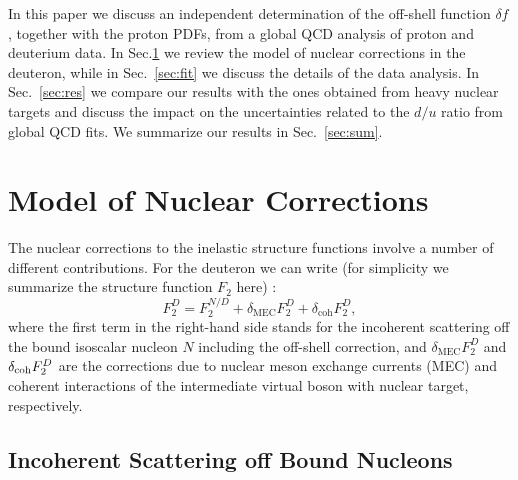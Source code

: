 \documentclass[%
      aps,
      prd,
      floatfix,
      preprintnumbers,
      preprint,
      showpacs,
      nofootinbib,
      tightenlines,
      amssymb,
      amsmath
]{revtex4-1}
\begin{document}
In this paper we discuss an independent determination of the off-shell function $\delta f$,  
together with the proton PDFs, from a global QCD analysis of proton and deuterium data.  
In Sec.\ref{sec:model} we review the model of nuclear corrections in the deuteron, while 
in Sec.~\ref{sec:fit} we discuss the details of the data analysis. In Sec.~\ref{sec:res} we compare our 
results with the ones obtained from heavy nuclear targets and discuss the impact on the uncertainties 
related to the $d/u$ ratio from global QCD fits. We summarize our results in Sec.~\ref{sec:sum}. 


\section{Model of Nuclear Corrections}
\label{sec:model}

The nuclear corrections to the inelastic structure functions involve a number of different contributions. 
For the deuteron we can write 
(for simplicity we summarize the structure function $F_2$ here) \cite{KP04,KP14}:
%
\begin{equation}
\label{F2D}
F_2^D = F_2^{N/D} + \delta_\mathrm{MEC} F_2^D + \delta_\mathrm{coh} F_2^D,
\end{equation}
%
where the first term in the right-hand side stands for the incoherent scattering off the 
bound isoscalar nucleon $N$ including the off-shell correction,
and $\delta_\mathrm{MEC} F_2^D$ and $\delta_{\rm coh} F_2^D$ are the corrections
due to nuclear meson exchange currents (MEC) and
coherent interactions of the intermediate virtual boson with nuclear target, respectively.

\subsection{Incoherent Scattering off Bound Nucleons} 
\label{sec:IA} 
\end{document}
